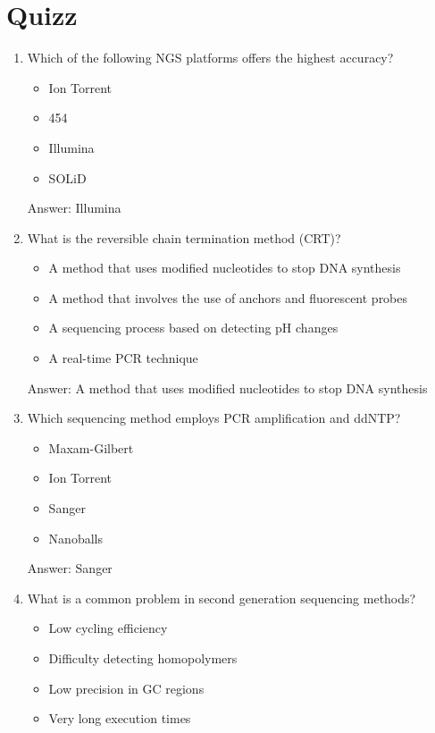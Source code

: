 \section{Quizz}
\begin{enumerate}
\item Which of the following NGS platforms offers the highest accuracy?
\begin{itemize}
\item Ion Torrent
\item 454
\item Illumina
\item SOLiD
\end{itemize}

Answer: Illumina

\item What is the reversible chain termination method (CRT)?
\begin{itemize}
\item A method that uses modified nucleotides to stop DNA synthesis
\item A method that involves the use of anchors and fluorescent probes
\item A sequencing process based on detecting pH changes
\item A real-time PCR technique
\end{itemize}

Answer: A method that uses modified nucleotides to stop DNA synthesis

\item Which sequencing method employs PCR amplification and ddNTP?
\begin{itemize}
\item Maxam-Gilbert
\item Ion Torrent
\item Sanger
\item Nanoballs
\end{itemize}

Answer: Sanger

\item What is a common problem in second generation sequencing methods?
\begin{itemize}
\item Low cycling efficiency
\item Difficulty detecting homopolymers
\item Low precision in GC regions
\item Very long execution times
\end{itemize}


\end{enumerate}
